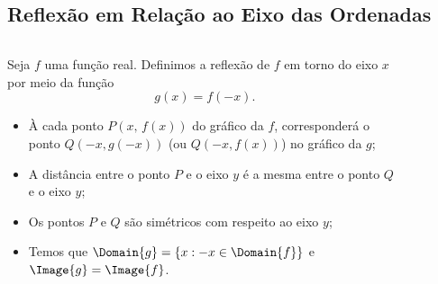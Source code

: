 \subsection{Reflexão em Relação ao Eixo das Ordenadas}
\begin{frame}
  \begin{columns}[onlytextwidth]
    \begin{column}{0.49\textwidth}\vspace*{-0.5cm}
      \begin{definition}
        Seja $f$ uma função real. Definimos a reflexão de $f$ em torno do eixo $x$ por meio da função
        \begin{equation*}
          g(x) = f(-x).
        \end{equation*}
      \end{definition}
      \begin{itemize}
        \item À cada ponto $P(x,\,f(x))$ do gráfico da $f$, corresponderá o ponto $Q(-x,g(-x))$ (ou $Q(-x,f(x))$) no gráfico da $g$;
        \item A distância entre o ponto $P$ e o eixo $y$ é a mesma entre o ponto $Q$ e o eixo $y$;
        \item Os pontos $P$ e $Q$ são simétricos com respeito ao eixo $y$;
        \item Temos que $\Domain{g} = \{x:-x\in\Domain{f}\}$ e $\Image{g}=\Image{f}$.
      \end{itemize}
    \end{column}
    \begin{column}{0.49\textwidth}
      \begin{figure}
      \end{figure}
    \end{column}
  \end{columns}
\end{frame}

